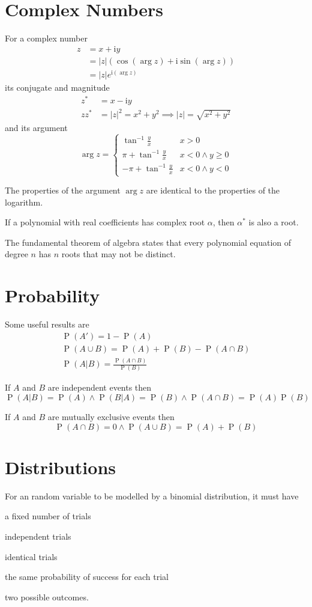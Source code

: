 \documentclass{slnotes}
\newcommand*{\im}{\mathrm{i}}
\DeclareMathOperator*{\Prb}{P}
\begin{document}
\chapter{Complex Numbers}
For a complex number \begin{align*}z &= x + \im y\\&= |z|(\cos(\arg z) + \im\sin(\arg z)) \\&= |z|e^{\im(\arg z)}\end{align*} its conjugate and magnitude \begin{align*}z^* &= x - \im y\\zz^* &= |z|^2 = x^2 + y^2 \implies |z| = \sqrt{x^2+y^2}\end{align*} and its argument \[\arg z = \begin{cases}\tan^{-1} \frac{y}{x} & x > 0\\\pi + \tan^{-1} \frac{y}{x} & x < 0 \wedge y \geq 0\\-\pi + \tan^{-1} \frac{y}{x} & x < 0 \wedge y < 0\end{cases}\]

The properties of the argument \(\arg z\) are identical to the properties of the logarithm.

If a polynomial with real coefficients has complex root \(\alpha\), then \(\alpha^*\) is also a root.

The fundamental theorem of algebra states that every polynomial equation of degree \(n\) has \(n\) roots that may not be distinct.
\chapter{Probability}
Some useful results are \begin{gather*}\Prb(A') = 1-\Prb(A)\\\Prb(A\cup B) = \Prb(A) + \Prb(B) - \Prb(A \cap B)\\\Prb(A | B) = \frac{\Prb(A \cap B)}{\Prb(B)}\end{gather*}

If \(A\) and \(B\) are independent events then \[\Prb(A|B) = \Prb(A) \wedge \Prb(B|A) = \Prb(B) \wedge \Prb(A\cap B) = \Prb(A)\Prb(B)\]

If \(A\) and \(B\) are mutually exclusive events then \[\Prb(A\cap B) = 0 \wedge \Prb(A \cup B) = \Prb(A) + \Prb(B)\]
\chapter{Distributions}
For an random variable to be modelled by a binomial distribution, it must have \begin{slinenum}
\item a fixed number of trials
\item independent trials
\item identical trials
\item the same probability of success for each trial
\item two possible outcomes.
\end{slinenum}
\end{document}
